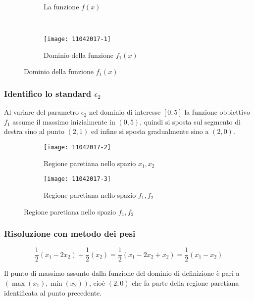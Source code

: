 \documentclass[\main/main.tex]{subfiles}
\begin{document}
\begin{figure}
  \begin{subfigure}{0.45\textwidth}
    \caption{La funzione $f(x)$}
  \end{subfigure}
  ~
  \begin{subfigure}{0.45\textwidth}
    \texttt{[image: 11042017-1]}
    \caption{Dominio della funzione $f_1(x)$}
  \end{subfigure}
\end{figure}

\subsubsection*{Identifico lo standard $\epsilon_2$}
Al variare del parametro $\epsilon_2$ nel dominio di interesse $[0,5]$ la funzione obbiettivo $f_1$ assume il massimo inizialmente in $(0,5)$, quindi si sposta sul segmento di destra sino al punto $(2,1)$ ed infine si sposta gradualmente sino a $(2,0)$.

\begin{figure}
  \begin{subfigure}{0.45\textwidth}
    \texttt{[image: 11042017-2]}
    \caption{Regione paretiana nello spazio $x_1, x_2$}
  \end{subfigure}
  \begin{subfigure}{0.45\textwidth}
    \texttt{[image: 11042017-3]}
    \caption{Regione paretiana nello spazio $f_1, f_2$}
  \end{subfigure}
\end{figure}

\subsubsection*{Risoluzione con metodo dei pesi}
\[
  \frac{1}{2}(x_1 - 2x_2) + \frac{1}{2}(x_2) = \frac{1}{2}(x_1 - 2x_2 + x_2) = \frac{1}{2}(x_1 - x_2)
\]

Il punto di massimo assunto dalla funzione del dominio di definizione è pari a $(\max(x_1), \min(x_2))$, cioè $(2,0)$ che fa parte della regione paretiana identificata al punto precedente.
\end{document}

